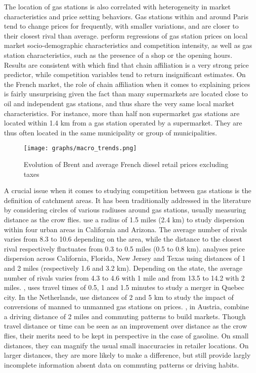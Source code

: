 \documentclass[english]{article}
\begin{document}
The location of gas stations is also correlated with heterogeneity in market characteristics and price setting behaviors. Gas stations within and around Paris tend to change prices for frequently, with smaller variations, and are closer to their closest rival than average. \cite{CHA16} perform regressions of gas station prices on local market socio-demographic characteristics and competition intensity, as well as gas station characteristics, such as the presence of a shop or the opening hours. Results are consistent with \cite{HOS08} which find that chain affiliation is a very strong price predictor, while competition variables tend to return insignificant estimates. On the French market, the role of chain affiliation when it comes to explaining prices is fairly unsurprising given the fact than many supermarkets are located close to oil and independent gas stations, and thus share the very same local market characteristics. For instance, more than half non supermarket gas stations are located within 1.4 km from a gas station operated by a supermarket. They are thus often located in the same municipality or group of municipalities.

\begin{figure}%
    \caption{Evolution of Brent and average French diesel retail prices excluding taxes}
	\centering
		\texttt{[image: graphs/macro\_trends.png]}
\label{fig:brent_and_diesel}
\end{figure}

A crucial issue when it comes to studying competition between gas stations is the definition of catchment areas. It has been traditionally addressed in the literature by considering circles of various radiuses around gas stations, usually measuring distance as the crow flies. \cite{BAR04} use a radius of 1.5 miles (2.4 km) to study dispersion within four urban areas in California and Arizona. The average number of rivals varies from 8.3 to 10.6 depending on the area, while the distance to the closest rival respectively fluctuates from 0.3 to 0.5 miles (0.5 to 0.8 km). \cite{TAP11} analyses price dispersion across California, Florida, New Jersey and Texas using distances of 1 and 2 miles (respectively 1.6 and 3.2 km). Depending on the state, the average number of rivals varies from 4.3 to 4.6 with 1 mile and from 13.5 to 14.2 with 2 miles. \cite{HOU12}, uses travel times of 0.5, 1 and 1.5 minutes to study a merger in Quebec city. In the Netherlands, \cite{BRU15} use distances of 2 and 5 km to study the impact of conversions of manned to unmanned gas stations on prices. \cite{PEN15}, in Austria, combine a driving distance of 2 miles and commuting patterns to build markets. 
Though travel distance or time can be seen as an improvement over distance as the crow flies, their merits need to be kept in perspective in the case of gasoline. On small distances, they can magnify the usual small inaccuracies in retailer locations. On larger distances, they are more likely to make a difference, but still provide largly incomplete information absent data on commuting patterns or driving habits.
\end{document}
